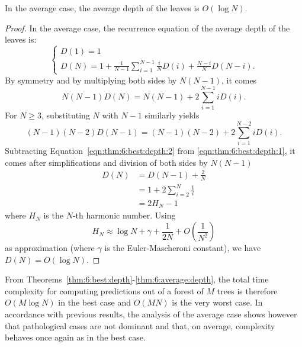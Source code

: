 \begin{theorem}\label{thm:6:average:depth}
In the average case, the average depth of the leaves is $O(\log N)$.
\end{theorem}

\begin{proof}
In the average case, the recurrence equation of the average depth of the leaves is:
\begin{equation}
\begin{cases}
D(1) = 1 \\
D(N) = 1 + \frac{1}{N-1} \sum_{i=1}^{N-1} \frac{i}{N} D(i) + \frac{N-i}{N} D(N-i).
\end{cases}
\end{equation}
By symmetry and by multiplying both sides by $N(N-1)$, it comes
\begin{equation}\label{eqn:thm:6:best:depth:1}
N(N-1) D(N) = N(N-1) + 2 \sum_{i=1}^{N-1} i D(i).
\end{equation}
For $N\geq3$, substituting $N$ with $N-1$ similarly yields
\begin{equation}\label{eqn:thm:6:best:depth:2}
(N-1)(N-2) D(N-1) = (N-1)(N-2) + 2 \sum_{i=1}^{N-2} i D(i).
\end{equation}
Subtracting Equation~\ref{eqn:thm:6:best:depth:2} from \ref{eqn:thm:6:best:depth:1},
it comes after simplifications and division of both sides by $N(N-1)$
\begin{align}
D(N) &= D(N-1) + \frac{2}{N} \nonumber \\
    &= 1 + 2 \sum_{i=2}^N \frac{1}{i} \nonumber \\
    &= 2H_N - 1
\end{align}
where $H_N$ is the $N$-th harmonic number. Using
\begin{equation}
H_N \approx \log N + \gamma + \frac{1}{2N} + O(\frac{1}{N^2})
\end{equation}
as approximation (where $\gamma$ is the Euler-Mascheroni constant), we have $D(N) = O(\log N)$.
\end{proof}

From Theorems~\ref{thm:6:best:depth}-\ref{thm:6:average:depth}, the total time
complexity for computing predictions out of a forest of $M$ trees is therefore
$O(M\log N)$ in the best case and $O(MN)$ is the very worst case. In accordance
with previous results, the analysis of the average case shows however that
pathological cases are not dominant and that, on average, complexity behaves
once again as in the best case.

